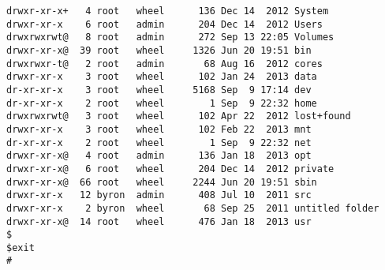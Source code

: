 \documentclass{article}
\begin{document}
\begin{lstlisting}
drwxr-xr-x+   4 root   wheel      136 Dec 14  2012 System
drwxr-xr-x    6 root   admin      204 Dec 14  2012 Users
drwxrwxrwt@   8 root   admin      272 Sep 13 22:05 Volumes
drwxr-xr-x@  39 root   wheel     1326 Jun 20 19:51 bin
drwxrwxr-t@   2 root   admin       68 Aug 16  2012 cores
drwxr-xr-x    3 root   wheel      102 Jan 24  2013 data
dr-xr-xr-x    3 root   wheel     5168 Sep  9 17:14 dev
dr-xr-xr-x    2 root   wheel        1 Sep  9 22:32 home
drwxrwxrwt@   3 root   wheel      102 Apr 22  2012 lost+found
drwxr-xr-x    3 root   wheel      102 Feb 22  2013 mnt
dr-xr-xr-x    2 root   wheel        1 Sep  9 22:32 net
drwxr-xr-x@   4 root   admin      136 Jan 18  2013 opt
drwxr-xr-x@   6 root   wheel      204 Dec 14  2012 private
drwxr-xr-x@  66 root   wheel     2244 Jun 20 19:51 sbin
drwxr-xr-x   12 byron  admin      408 Jul 10  2011 src
drwxr-xr-x    2 byron  wheel       68 Sep 25  2011 untitled folder
drwxr-xr-x@  14 root   wheel      476 Jan 18  2013 usr
$
$exit
#
\end{lstlisting}
\end{document}
